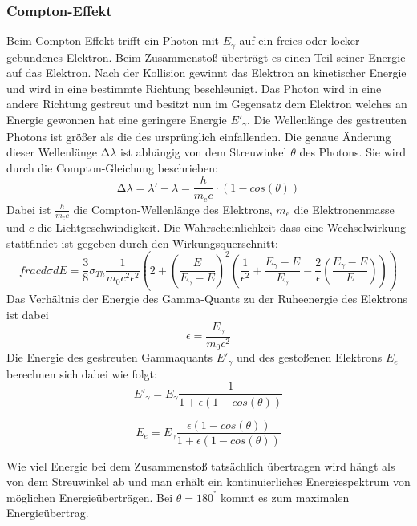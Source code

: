 \subsubsection{Compton-Effekt}
Beim Compton-Effekt trifft ein Photon mit $E_{\gamma}$ auf ein freies oder locker gebundenes Elektron. Beim Zusammenstoß überträgt es einen Teil seiner Energie auf das 
Elektron. Nach der Kollision gewinnt das Elektron an kinetischer Energie und wird in eine bestimmte Richtung beschleunigt. Das Photon wird in eine andere Richtung gestreut 
und besitzt nun im Gegensatz dem Elektron welches an Energie gewonnen hat eine geringere Energie $E'_{\gamma}$. Die Wellenlänge des 
gestreuten Photons ist größer als die des ursprünglich einfallenden. Die genaue Änderung dieser Wellenlänge $\increment\lambda$ ist abhängig von dem Streuwinkel $\theta$ des
Photons. Sie wird durch die Compton-Gleichung beschrieben:
\begin{equation}
    \increment\lambda= \lambda'-\lambda=\frac{h}{m_ec}\cdot(1-cos(\theta)) 
\end{equation}
Dabei ist $\frac{h}{m_ec}$ die Compton-Wellenlänge des Elektrons, \(m_e\) die Elektronenmasse und \(c\) die Lichtgeschwindigkeit.
Die Wahrscheinlichkeit dass eine Wechselwirkung stattfindet ist gegeben durch den Wirkungsquerschnitt:
\begin{equation}
frac{d\sigma}{dE} = \frac{3}{8}\sigma_{Th}\frac{1}{m_0c^2\epsilon^2}\left(2 + \left(\frac{E}{E_{\gamma}-E}\right)^2 \left(\frac{1}{\epsilon^2} + \frac{E_{\gamma}-E}{E_{\gamma}} - \frac{2}{\epsilon}\left(\frac{E_{\gamma}-E}{E}\right)\right)\right)
\end{equation}
Das Verhältnis der Energie des Gamma-Quants zu der Ruheenergie des Elektrons ist dabei
\begin{equation}
    \epsilon=\frac{E_{\gamma}}{m_0c^2}
\end{equation}    
Die Energie des gestreuten Gammaquants $E'_{\gamma}$ und des gestoßenen Elektrons $E_e$ berechnen sich dabei wie folgt:
\begin{equation}
    E'_{\gamma}=E_{\gamma}\frac{1}{1+\epsilon(1-cos(\theta))}
\end{equation}

\begin{equation}
    E_e=E_{\gamma}\frac{\epsilon(1-cos(\theta))}{1+\epsilon(1-cos(\theta))}
\end{equation}

Wie viel Energie bei dem Zusammenstoß tatsächlich übertragen wird hängt als von dem Streuwinkel ab und man erhält ein kontinuierliches 
Energiespektrum von möglichen Energieüberträgen. Bei $\theta= 180^°$ kommt es zum maximalen Energieübertrag.
\cite{Compton}



